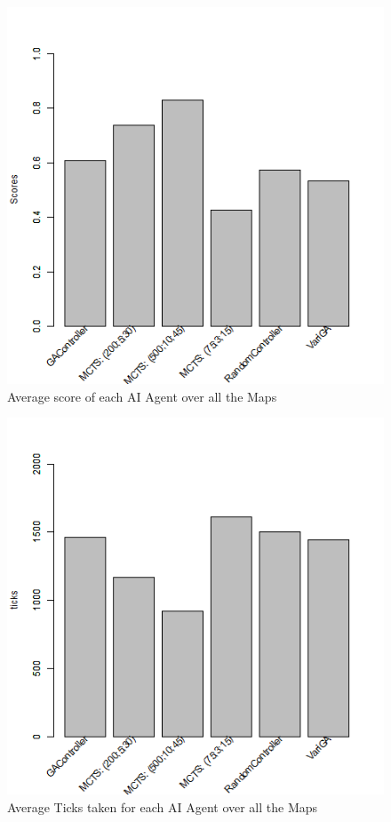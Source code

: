 \documentclass{IEEEtran}
\begin{document}
\begin{figure}[!ht]
\centering
\includegraphics[width=\linewidth]{scores-allmaps}
\caption{Average score of each AI Agent over all the Maps}
\label{avgScoreAllMaps}
\end{figure}

\begin{figure}[!ht]
\centering
\includegraphics[width=\linewidth]{ticks-allmaps}
\caption{Average Ticks taken for each AI Agent over all the Maps}
\label{avgTicksAllMaps}
\end{figure}
\end{document}
